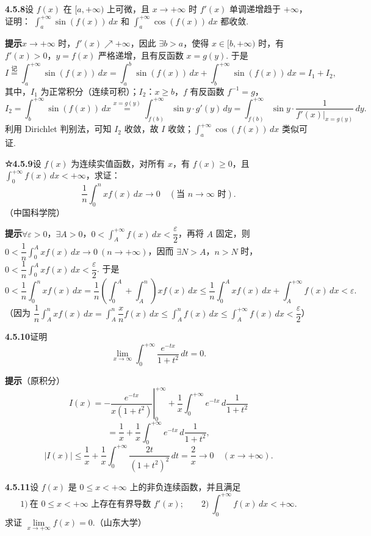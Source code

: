 \documentclass[UTF8, 12pt, fontset=fandol, oneside]{ctexart}
\begin{document}
\noindent\textbf{4.5.8}\quad 设 $f(x)$ 在 $[a,+\infty)$ 上可微，且 $x\to+\infty$ 时 $f'(x)$ 单调递增趋于 $+\infty$，证明：
$\displaystyle\int_a^{+\infty}\sin(f(x))\,dx$ 和 $\displaystyle\int_a^{+\infty}\cos(f(x))\,dx$ 都收敛.

\noindent\textbf{提示}\quad $x\to+\infty$ 时，$f'(x)\nearrow+\infty$，因此 $\exists b>a$，使得 $x\in[b,+\infty)$ 时，有 $f'(x)>0$，$y=f(x)$ 严格递增，且有反函数 $x=g(y)$. 于是
\[
I\stackrel{\text{记}}{=}\int_a^{+\infty}\sin(f(x))\,dx
=\int_a^b\sin(f(x))\,dx+\int_b^{+\infty}\sin(f(x))\,dx=I_1+I_2,
\]
其中，$I_1$ 为正常积分（连续可积）；$I_2$：$x\ge b$，$f$ 有反函数 $f^{-1}=g$，
\[
I_2=\int_b^{+\infty}\sin(f(x))\,dx
\stackrel{x=g(y)}{=}\int_{f(b)}^{+\infty}\sin y\cdot g'(y)\,dy
=\int_{f(b)}^{+\infty}\sin y\cdot\frac1{f'(x)|_{x=g(y)}}\,dy.
\]
利用 Dirichlet 判别法，可知 $I_2$ 收敛，故 $I$ 收敛；$\displaystyle\int_a^{+\infty}\cos(f(x))\,dx$ 类似可证.

\noindent\textbf{☆4.5.9}\quad 设 $f(x)$ 为连续实值函数，对所有 $x$，有 $f(x)\ge0$，且
$\displaystyle\int_0^{+\infty}f(x)\,dx<+\infty$，求证：
\[
\frac1n\int_0^nxf(x)\,dx\longrightarrow0\quad(\text{当 }n\to\infty\text{ 时}).
\]
（中国科学院）

\noindent\textbf{提示}\quad $\forall\varepsilon>0$，$\exists A>0$，$0<\displaystyle\int_A^{+\infty}f(x)\,dx<\dfrac\varepsilon2$，再将 $A$ 固定，则
$0<\dfrac1n\displaystyle\int_0^Axf(x)\,dx\to0\ (n\to+\infty)$，因而 $\exists N>A$，$n>N$ 时，
$0<\dfrac1n\displaystyle\int_0^Axf(x)\,dx<\dfrac\varepsilon2$. 于是
\[
0<\frac1n\int_0^nxf(x)\,dx
=\frac1n\left(\int_0^A+\int_A^n\right)xf(x)\,dx
\le\frac1n\int_0^Axf(x)\,dx+\int_A^{+\infty}f(x)\,dx<\varepsilon.
\]
（因为 $\dfrac1n\displaystyle\int_A^nxf(x)\,dx=\displaystyle\int_A^n\dfrac xn f(x)\,dx
\le\displaystyle\int_A^n f(x)\,dx\le\displaystyle\int_A^{+\infty}f(x)\,dx<\dfrac\varepsilon2$）

\noindent\textbf{4.5.10}\quad 证明
\[
\lim_{x\to\infty}\int_0^{+\infty}\frac{e^{-tx}}{1+t^2}\,dt=0.
\]

\noindent\textbf{提示}\quad （原积分）
\[
I(x)=-\left.\frac{e^{-tx}}{x(1+t^2)}\right|_0^{+\infty}
+\frac1x\int_0^{+\infty}e^{-tx}\,d\frac1{1+t^2}
\]
\[
=\frac1x+\frac1x\int_0^{+\infty}e^{-tx}\,d\frac1{1+t^2},
\]
\[
|I(x)|\le\frac1x+\frac1x\int_0^{+\infty}\frac{2t}{(1+t^2)^2}\,dt=\frac2x\to0\quad(x\to+\infty).
\]

\noindent\textbf{4.5.11}\quad 设 $f(x)$ 是 $0\le x<+\infty$ 上的非负连续函数，并且满足
\[
1)\ \text{在 }0\le x<+\infty\text{ 上存在有界导数 }f'(x);\qquad
2)\ \int_0^{+\infty}f(x)\,dx<+\infty.
\]
求证 $\lim\limits_{x\to+\infty}f(x)=0$.（山东大学）
\end{document}
